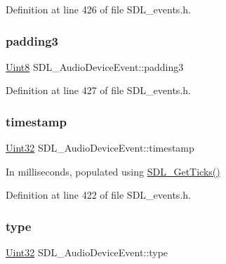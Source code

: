 Definition at line 426 of file S\+D\+L\+\_\+events.\+h.

\mbox{\label{struct_s_d_l___audio_device_event_af3163ba92c77f08a4f0d8f043f24c96c}} 
\subsubsection{\texorpdfstring{padding3}{padding3}}
{\footnotesize\ttfamily \mbox{\hyperlink{_s_d_l__stdinc_8h_a2944638813a090aa23e62f4da842c3e2}{Uint8}} S\+D\+L\+\_\+\+Audio\+Device\+Event\+::padding3}



Definition at line 427 of file S\+D\+L\+\_\+events.\+h.

\mbox{\label{struct_s_d_l___audio_device_event_aa471680486a6103eafc9af569016df57}} 
\subsubsection{\texorpdfstring{timestamp}{timestamp}}
{\footnotesize\ttfamily \mbox{\hyperlink{_s_d_l__stdinc_8h_add440eff171ea5f55cb00c4a9ab8672d}{Uint32}} S\+D\+L\+\_\+\+Audio\+Device\+Event\+::timestamp}

In milliseconds, populated using \mbox{\hyperlink{_s_d_l__timer_8h_a0b9bc71d6287e0ffafdc3419760fe2b3}{S\+D\+L\+\_\+\+Get\+Ticks()}} 

Definition at line 422 of file S\+D\+L\+\_\+events.\+h.

\mbox{\label{struct_s_d_l___audio_device_event_ae68c3bd49b49608711a17395c7cbfe58}} 
\subsubsection{\texorpdfstring{type}{type}}
{\footnotesize\ttfamily \mbox{\hyperlink{_s_d_l__stdinc_8h_add440eff171ea5f55cb00c4a9ab8672d}{Uint32}} S\+D\+L\+\_\+\+Audio\+Device\+Event\+::type}

